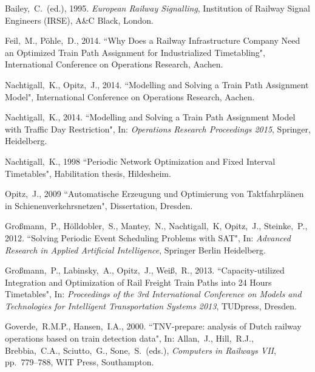 \documentclass[10pt,a4paper,oneside,onecolumn]{article}
\begin{document}
\begin{thebibliography}{99}
	\setlength{\itemsep}{0\parskip}

	Bailey,~C.~(ed.), 1995.
	{\em European Railway Signalling},
	Institution of Railway Signal Engineers (IRSE),
	A\&C Black, London.
	
	Feil,~M., P\"ohle,~D., 2014.
	{``Why Does a Railway Infrastructure Company Need an Optimized Train Path Assignment for Industrialized Timetabling"},
	International Conference on Operations Research,
	Aachen.
	
	Nachtigall,~K., Opitz,~J., 2014.
	{``Modelling and Solving a Train Path Assignment Model"},
	International Conference on Operations Research,
	Aachen.
	
	Nachtigall,~K., 2014.
	{``Modelling and Solving a Train Path Assignment Model with Traffic Day Restriction"},
	In: {\em Operations Research Proceedings 2015},
	Springer, Heidelberg.
	
	Nachtigall,~K., 1998
	{``Periodic Network Optimization and Fixed Interval Timetables"},
	Habilitation thesis,
	Hildesheim.
	
	Opitz,~J., 2009
	{``Automatische Erzeugung und Optimierung von Taktfahrplänen in Schienenverkehrsnetzen"},
	Dissertation,
	Dresden.
	
	Gro{\ss}mann,~P., H\"olldobler,~S., Mantey,~N., Nachtigall,~K, Opitz,~J., Steinke,~P., 2012.
	``Solving Periodic Event Scheduling Problems with SAT",
	In: {\em Advanced Research in Applied Artificial Intelligence},
	Springer Berlin Heidelberg.
	
	Gro{\ss}mann,~P., Labinsky,~A., Opitz,~J., Wei{\ss},~R., 2013.
	``Capacity-utilized Integration and Optimization of Rail Freight Train Paths into 24 Hours Timetables",
	In: {\em Proceedings of the 3rd International Conference on Models and Technologies for Intelligent Transportation Systems 2013},
	TUDpress, Dresden.

	Goverde,~R.M.P., Hansen,~I.A., 2000.
	``TNV-prepare: analysis of Dutch railway operations
	based on train detection data",
	In: Allan,~J., Hill,~R.J., Brebbia,~C.A., Sciutto,~G., Sone,~S.~(eds.),
	{\em Computers in Railways VII},
	pp.~779--788,
	WIT Press, Southampton.


\end{thebibliography}
\end{document}
